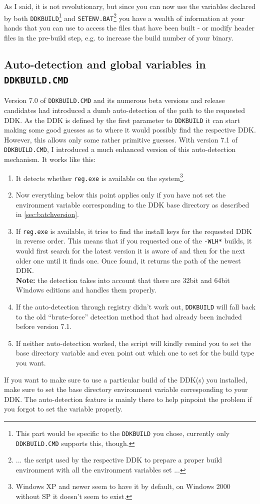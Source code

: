 \documentclass[a4paper,titlepage]{report}
\begin{document}
As I said, it is not revolutionary, but since you can now use the variables declared by both
\texttt{DDKBUILD}\footnote{This part would be specific to the \texttt{DDKBUILD} you chose,
currently only \texttt{DDKBUILD.CMD} supports this, though.} and \texttt{SETENV.BAT}\footnote{... the
script used by the respective DDK to prepare a proper build environment with all the
environment variables set ...} you have a wealth of information at your hands that
you can use to access the files that have been built - or modify header files in the
pre-build step, e.g. to increase the build number of your binary.

\subsection{Auto-detection and global variables in \texttt{DDKBUILD.CMD}}
Version 7.0 of \texttt{DDKBUILD.CMD} and its numerous beta versions and release candidates
had introduced a dumb auto-detection of the path to the requested DDK. As the DDK is
defined by the first parameter to \texttt{DDKBUILD} it can start making some good guesses
as to where it would possibly find the respective DDK. However, this allows only some
rather primitive guesses. With version 7.1 of \texttt{DDKBUILD.CMD}, I introduced a much
enhanced version of this auto-detection mechanism. It works like this:
\begin{enumerate}
  \item It detects whether \texttt{reg.exe} is available on the system\footnote{Windows XP
        and newer seem to have it by default, on Windows 2000 without SP it doesn't seem to
        exist.}.
  \item Now everything below this point applies only if you have not set the environment
        variable corresponding to the DDK base directory as described in \autoref{sec:batchversion}.
  \item If \texttt{reg.exe} is available, it tries to find the install keys for the
        requested DDK in reverse order. This means that if you requested one of the \verb+-WLH*+
        builds, it would first search for the latest version it is aware of and then for
        the next older one until it finds one. Once found, it returns the path of the newest DDK.\\
        \textbf{Note:} the detection takes into account that there are 32bit and 64bit Windows
        editions and handles them properly.
  \item If the auto-detection through registry didn't work out, \texttt{DDKBUILD} will fall back
        to the old ``brute-force'' detection method that had already been included before version 7.1.
  \item If neither auto-detection worked, the script will kindly remind you to set the base directory
        variable and even point out which one to set for the build type you want.
\end{enumerate}
If you want to make sure to use a particular build of the DDK(s) you installed, make sure to set the
base directory environment variable corresponding to your DDK. The auto-detection feature is mainly
there to help pinpoint the problem if you forgot to set the variable properly.
\end{document}
